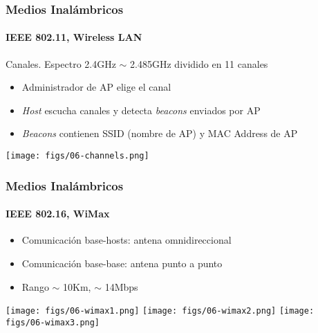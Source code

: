 \documentclass[letter]{beamer}
\begin{document}
\begin{frame}
  \frametitle{Medios Inalámbricos}
  \framesubtitle{IEEE 802.11, Wireless LAN}

  Canales. Espectro 2.4GHz $\sim$ 2.485GHz dividido en 11 canales
  
  \begin{itemize}
    \item Administrador de AP elige el canal
    \item {\em Host} escucha canales y detecta {\em beacons} enviados por AP
    \item {\em Beacons} contienen SSID (nombre de AP) y MAC Address de AP
  \end{itemize}  

  \begin{center}
    \texttt{[image: figs/06-channels.png]}
  \end{center}

\end{frame}
\begin{frame}
  \frametitle{Medios Inalámbricos}
  \framesubtitle{IEEE 802.16, WiMax}

  \begin{itemize}
    \item Comunicación base-hosts: antena omnidireccional
    \item Comunicación base-base: antena punto a punto
    \item Rango $\sim$ 10Km, $\sim$ 14Mbps
  \end{itemize}

  \begin{center}
    \texttt{[image: figs/06-wimax1.png]}
    \texttt{[image: figs/06-wimax2.png]}
    \texttt{[image: figs/06-wimax3.png]}
  \end{center}


\end{frame}
\end{document}
